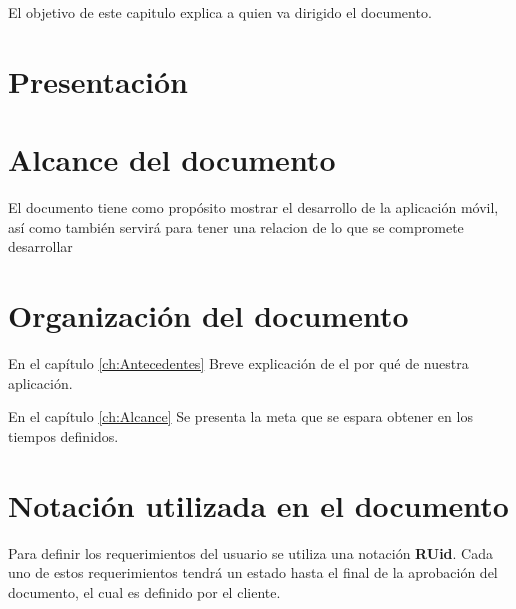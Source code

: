 
El objetivo de este capitulo explica a quien va dirigido el documento.


\section{Presentación}

\section{Alcance del documento}

El documento tiene como propósito mostrar el desarrollo de la aplicación móvil, así como también servirá para tener una relacion de lo que se compromete desarrollar 


\section{Organización del documento}

En el capítulo \ref{ch:Antecedentes} Breve explicación de el por qué de nuestra aplicación.

En el capítulo \ref{ch:Alcance} Se presenta la meta que se espara obtener en los tiempos definidos.



\section{Notación utilizada en el documento}

Para definir los requerimientos del usuario se utiliza una notación \textbf{RUid}. Cada uno de estos requerimientos tendrá un estado hasta el final de la aprobación del documento, el cual es definido por el cliente.

